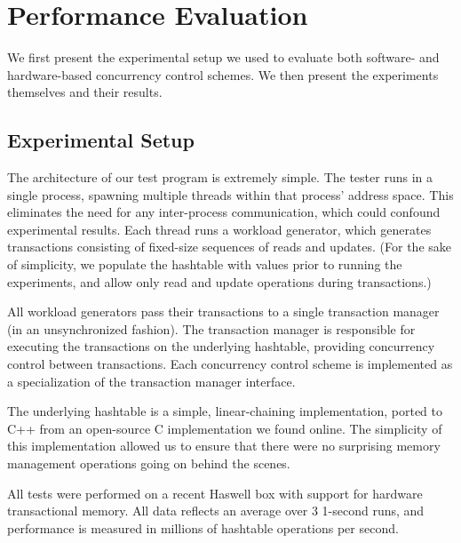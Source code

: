 \section{Performance Evaluation} \label{sec:eval}
We first present the experimental setup we used to evaluate both software- and hardware-based concurrency control schemes. We then present the experiments themselves and their results.

\subsection{Experimental Setup}
The architecture of our test program is extremely simple. The tester runs in a
single process, spawning multiple threads within that process' address
space. This eliminates the need for any inter-process communication, which could
confound experimental results. Each thread runs a workload generator, which
generates transactions consisting of fixed-size sequences of reads and
updates. (For the sake of simplicity, we populate the hashtable with values
prior to running the experiments, and allow only read and update operations
during transactions.)

All workload generators pass their transactions to a single transaction manager
(in an unsynchronized fashion). The transaction manager is responsible for
executing the transactions on the underlying hashtable, providing concurrency
control between transactions. Each concurrency control scheme is implemented as
a specialization of the transaction manager interface.

The underlying hashtable is a simple, linear-chaining implementation, ported to
C++ from an open-source C implementation we found online. The simplicity of this
implementation allowed us to ensure that there were no surprising memory
management operations going on behind the scenes.

All tests were performed on a recent Haswell box with support for hardware
transactional memory. All data reflects an average over 3 1-second runs, and
performance is measured in millions of hashtable operations per second.

